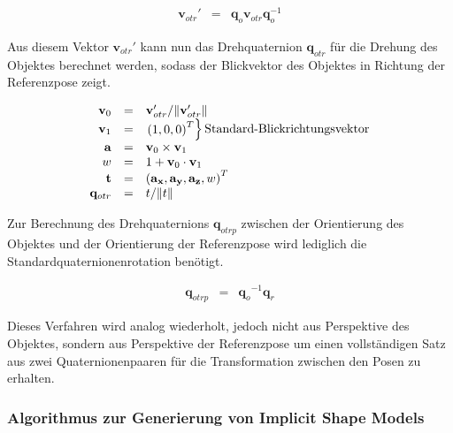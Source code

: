 \begin{equation}
  \begin{array}{rcl}
    \mathbf{v}_{otr}' & = & \mathbf{q}_o \mathbf{v}_{otr} \mathbf{q}_o^{-1}
  \end{array}
\end{equation}

Aus diesem Vektor $\mathbf{v}_{otr}'$ kann nun das Drehquaternion $\mathbf{q}_{otr}$ für die Drehung des Objektes berechnet werden, sodass der Blickvektor des Objektes in Richtung der Referenzpose zeigt.

\begin{equation}
  \begin{array}{rcl}
    \mathbf{v}_0 & = & \mathbf{v}_{otr}' / \|\mathbf{v}_{otr}'\|\\
    \mathbf{v}_1 & = & \begin{rcases}{(1, 0, 0)}^T\end{rcases} \text{Standard-Blickrichtungsvektor}\\
    \mathbf{a} & = & \mathbf{v}_0 \times \mathbf{v}_1\\
    w & = & 1 + \mathbf{v}_0 \cdot \mathbf{v}_1\\
    \mathbf{t} & = & {(\mathbf{a_x},\mathbf{a_y},\mathbf{a_z},w)}^T\\
    \mathbf{q}_{otr} & = & t / \|t\|
  \end{array}
\end{equation}

Zur Berechnung des Drehquaternions $\mathbf{q}_{otrp}$ zwischen der Orientierung des Objektes und der Orientierung der Referenzpose wird lediglich die Standardquaternionenrotation benötigt.

\begin{equation}
  \begin{array}{rcl}
    \mathbf{q}_{otrp} & = & {\mathbf{q}_o}^{-1} \mathbf{q}_r
  \end{array}
\end{equation}

Dieses Verfahren wird analog wiederholt, jedoch nicht aus Perspektive des Objektes, sondern aus Perspektive der Referenzpose um einen vollständigen Satz aus zwei Quaternionenpaaren für die Transformation zwischen den Posen zu erhalten.

\subsubsection{Algorithmus zur Generierung von Implicit Shape Models}

